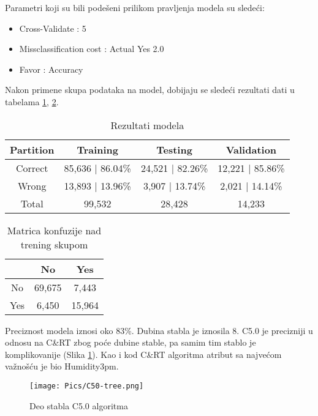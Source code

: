 \documentclass[a4paper]{article}
\begin{document}
Parametri koji su bili podešeni prilikom pravljenja modela su sledeći:
\begin{itemize}
    \item Cross-Validate : 5
    \item Missclassification cost : Actual Yes 2.0
    \item Favor : Accuracy
\end{itemize}
\par

Nakon primene skupa podataka na model, dobijaju se sledeći rezultati dati u tabelama \ref{tab:C50-res}, \ref{tab:C50-CM}.
\begin{table}[H]
\begin{center}
\caption{Rezultati modela}
\label{tab:C50-res}
\begin{tabular}{|c|c|c|c|} \hline
\textbf{Partition} & \textbf{Training} & \textbf{Testing} &  \textbf{Validation} \\ \hline
Correct & 85,636 | 86.04\% & 24,521 | 82.26\% & 12,221 | 85.86\% \\ \hline
Wrong & 13,893 | 13.96\%   & 3,907 | 13.74\% & 2,021 | 14.14\% \\ \hline
Total & 99,532  & 28,428 & 14,233 \\ \hline
\end{tabular}
\end{center}
\end{table}
\begin{table}[H]
\begin{center}
\caption{Matrica konfuzije nad trening skupom}
\label{tab:C50-CM}
\begin{tabular}{|c|c|c|} \hline
\textbf{} & \textbf{No} & \textbf{Yes} \\ \hline
No &69,675 & 7,443  \\ \hline
Yes &  6,450 & 15,964 \\ \hline
\end{tabular}
\end{center}
\end{table}

Preciznost modela iznosi oko 83\%. Dubina stabla je iznosila 8. C5.0 je precizniji u odnosu na C\&RT zbog poće dubine stable, pa samim tim stablo je komplikovanije (Slika \ref{fig:C50-tree}). Kao i kod C\&RT algoritma atribut sa najvećom važnošću je bio Humidity3pm. 

\begin{figure}[H]
     \centering
     \texttt{[image: Pics/C50-tree.png]}
     \caption{Deo stabla C5.0 algoritma}
     \label{fig:C50-tree}
\end{figure}
\end{document}
